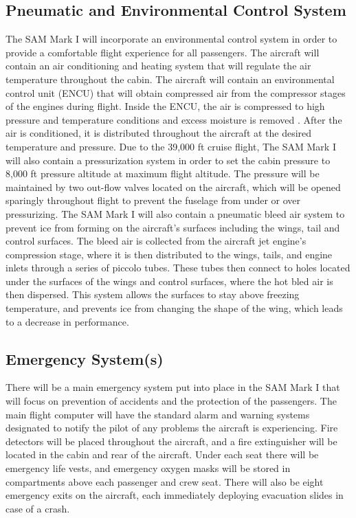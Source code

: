 \subsection{Pneumatic and Environmental Control System}
The SAM Mark I will incorporate an environmental control system in order to provide a comfortable flight experience for all passengers. The aircraft will contain an air conditioning and heating system that will regulate the air temperature throughout the cabin. The aircraft will contain an environmental control unit (ENCU) that will obtain compressed air from the compressor stages of the engines during flight. Inside the ENCU, the air is compressed to high pressure and temperature conditions and excess moisture is removed \cite{env_system}. After the air is conditioned, it is distributed throughout the aircraft at the desired temperature and pressure. Due to the 39,000 ft cruise flight, The SAM Mark I will also contain a pressurization system in order to set the cabin pressure to 8,000 ft pressure altitude at maximum flight altitude. The pressure will be maintained by two out-flow valves located on the aircraft, which will be opened sparingly throughout flight to prevent the fuselage from under or over pressurizing. The SAM Mark I will also contain a pneumatic bleed air system to prevent ice from forming on the aircraft’s surfaces including the wings, tail and control surfaces. The bleed air is collected from the aircraft jet engine’s compression stage, where it is then distributed to the wings, tails, and engine inlets through a series of piccolo tubes. These tubes then connect to holes located under the surfaces of the wings and control surfaces, where the hot bled air is then dispersed. This system allows the surfaces to stay above freezing temperature, and prevents ice from changing the shape of the wing, which leads to a decrease in performance.

\subsection{Emergency System(s)}
There will be a main emergency system put into place in the SAM Mark I that will focus on prevention of accidents and the protection of the passengers. The main flight computer will have the standard alarm and warning systems designated to notify the pilot of any problems the aircraft is experiencing. Fire detectors will be placed throughout the aircraft, and a fire extinguisher will be located in the cabin and rear of the aircraft. Under each seat there will be emergency life vests, and emergency oxygen masks will be stored in compartments above each passenger and crew seat. There will also be eight emergency exits on the aircraft, each immediately deploying evacuation slides in case of a crash. 

